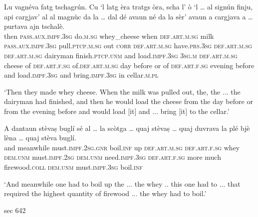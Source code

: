 \begin{linenumbers}
	\gll Lu vagnéva fatg tschagrún. Cu `l latg èra tratgs òra, scha l’ ò `l … al signún finju, api cargjav’ al al magnùc da la … dal dé avaun né da la sèr’ avaun a cargjava a … purtava ajn tschalè.   \\
	then \textsc{pass.aux.impf.3sg} do.\textsc{m.sg} whey\_cheese when \textsc{def.art.m.sg} milk \textsc{pass.aux.impf.3sg} pull.\textsc{ptcp.m.sg} out \textsc{corr} \textsc{def.art.m.sg} have.\textsc{prs.3sg} \textsc{def.art.m.sg} {} \textsc{def.art.m.sg} dairyman finish.\textsc{ptcp.unm} and load.\textsc{impf.3sg} \textsc{3sg.m} \textsc{def.art.m.sg} cheese of \textsc{def.art.f.sg} {} of.\textsc{def.art.m.sg} day before or of \textsc{def.art.f.sg} evening before and load.\textsc{impf.3sg} and {} bring.\textsc{impf.3sg} in cellar.\textsc{m.pl}\\
\end{linenumbers}
\medskip
\glt `Then they made whey cheese. When the milk was pulled out, the, the ... the dairyman had finished, and then he would load the cheese from the day before or from the evening before and would load [it] and ... bring [it] to the cellar.'
\medskip

\begin{linenumbers}
	\gll  A dantaun stèvaṣ buglí sé al … la scòtga … quaj stèvaṣ … quaj duvrava la plé bjè lèna … quaj stèva buglí.  \\
	and meanwhile must.\textsc{impf.2sg.gnr} boil.\textsc{inf} up \textsc{def.art.m.sg} {} \textsc{def.art.f.sg} whey {} \textsc{dem.unm} must.\textsc{impf.2sg} {} \textsc{dem.unm} need.\textsc{impf.3sg} \textsc{def.art.f.sg} more much firewood.\textsc{coll} {} \textsc{dem.unm} must.\textsc{impf.3sg} boil.\textsc{inf}\\
\end{linenumbers}
\medskip
\glt `And meanwhile one had to boil up the ... the whey .. this one had to ... that required the highest quantity of firewood ... the whey had to boil.'
\medskip

sec 642

